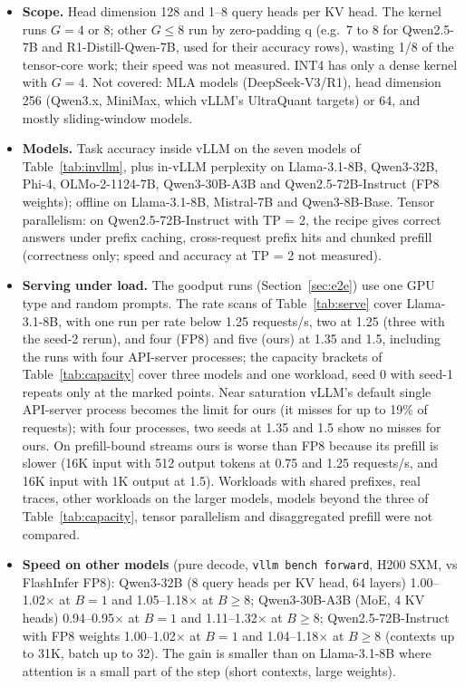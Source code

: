 \documentclass[11pt]{article}
\begin{document}
\begin{itemize}
  \item \textbf{Scope.} Head dimension 128 and 1--8 query heads per KV head. The kernel runs $G = 4$ or 8; other $G \leq 8$ run by zero-padding q (e.g.\ 7 to 8 for Qwen2.5-7B and R1-Distill-Qwen-7B, used for their accuracy rows), wasting 1/8 of the tensor-core work; their speed was not measured. INT4 has only a dense kernel with $G = 4$. Not covered: MLA models (DeepSeek-V3/R1), head dimension 256 (Qwen3.x, MiniMax, which vLLM's UltraQuant targets) or 64, and mostly sliding-window models.
  \item \textbf{Models.} Task accuracy inside vLLM on the seven models of Table~\ref{tab:invllm}, plus in-vLLM perplexity on Llama-3.1-8B, Qwen3-32B, Phi-4, OLMo-2-1124-7B, Qwen3-30B-A3B and Qwen2.5-72B-Instruct (FP8 weights); offline on Llama-3.1-8B, Mistral-7B and Qwen3-8B-Base. Tensor parallelism: on Qwen2.5-72B-Instruct with TP = 2, the recipe gives correct answers under prefix caching, cross-request prefix hits and chunked prefill (correctness only; speed and accuracy at TP = 2 not measured).
  \item \textbf{Serving under load.} The goodput runs (Section~\ref{sec:e2e}) use one GPU type and random prompts. The rate scans of Table~\ref{tab:serve} cover Llama-3.1-8B, with one run per rate below 1.25 requests/s, two at 1.25 (three with the seed-2 rerun), and four (FP8) and five (ours) at 1.35 and 1.5, including the runs with four API-server processes; the capacity brackets of Table~\ref{tab:capacity} cover three models and one workload, seed 0 with seed-1 repeats only at the marked points. Near saturation vLLM's default single API-server process becomes the limit for ours (it misses for up to 19\% of requests); with four processes, two seeds at 1.35 and 1.5 show no misses for ours. On prefill-bound streams ours is worse than FP8 because its prefill is slower (16K input with 512 output tokens at 0.75 and 1.25 requests/s, and 16K input with 1K output at 1.5). Workloads with shared prefixes, real traces, other workloads on the larger models, models beyond the three of Table~\ref{tab:capacity}, tensor parallelism and disaggregated prefill were not compared.
  \item \textbf{Speed on other models} (pure decode, \texttt{vllm bench forward}, H200 SXM, vs FlashInfer FP8): Qwen3-32B (8 query heads per KV head, 64 layers) 1.00--1.02$\times$ at $B = 1$ and 1.05--1.18$\times$ at $B \geq 8$; Qwen3-30B-A3B (MoE, 4 KV heads) 0.94--0.95$\times$ at $B = 1$ and 1.11--1.32$\times$ at $B \geq 8$; Qwen2.5-72B-Instruct with FP8 weights 1.00--1.02$\times$ at $B = 1$ and 1.04--1.18$\times$ at $B \geq 8$ (contexts up to 31K, batch up to 32). The gain is smaller than on Llama-3.1-8B where attention is a small part of the step (short contexts, large weights).

\end{itemize}
\end{document}
